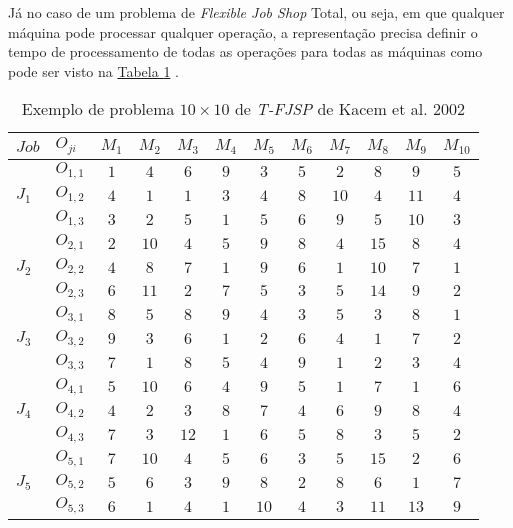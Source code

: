 \indent Já no caso de um problema de \textit{Flexible Job Shop} Total, ou seja, em que qualquer máquina pode processar qualquer operação, a representação precisa definir o tempo de processamento de todas as operações para todas as máquinas como pode ser visto na 
\hyperref[tab:ex-instancia-problema-TFJSP]{Tabela \ref{tab:ex-instancia-problema-TFJSP}}
.
\begin{table}[htb]
    \centering
    \caption{Exemplo de problema $10\times10$ de \textit{T-FJSP} de Kacem et al. 2002}
    \label{tab:ex-instancia-problema-TFJSP}
    \begin{tabular}[t]{llcccccccccc}
\hline
$Job$&$O_{ji}$&$M_1$&$M_2$&$M_3$&$M_4$&$M_5$&$M_6$&$M_7$&$M_8$&$M_9$&$M_{10}$\\
\hline
\multirow{3}{*}{$J_1$}&$O_{1,1}$ & $1$ & $4$ & $6$ & $9$ & $3$ & $5$ & $2$ & $8$ & $9$ & $5$\\
&$O_{1,2}$ & $4$ & $1$ & $1$ & $3$ & $4$ & $8$ & $10$ & $4$ & $11$ & $4$\\
&$O_{1,3}$ & $3$ & $2$ & $5$ & $1$ & $5$ & $6$ & $9$ & $5$ & $10$ & $3$\\
\multirow{3}{*}{$J_2$}&$O_{2,1}$ & $2$ & $10$ & $4$ & $5$ & $9$ & $8$ & $4$ & $15$ & $8$ & $4$\\
&$O_{2,2}$ & $4$ & $8$ & $7$ & $1$ & $9$ & $6$ & $1$ & $10$ & $7$ & $1$\\
&$O_{2,3}$ & $6$ & $11$ & $2$ & $7$ & $5$ & $3$ & $5$ & $14$ & $9$ & $2$\\
\multirow{3}{*}{$J_3$}&$O_{3,1}$ & $8$ & $5$ & $8$ & $9$ & $4$ & $3$ & $5$ & $3$ & $8$ & $1$\\
&$O_{3,2}$ & $9$ & $3$ & $6$ & $1$ & $2$ & $6$ & $4$ & $1$ & $7$ & $2$\\
&$O_{3,3}$ & $7$ & $1$ & $8$ & $5$ & $4$ & $9$ & $1$ & $2$ & $3$ & $4$\\
\multirow{3}{*}{$J_4$}&$O_{4,1}$ & $5$ & $10$ & $6$ & $4$ & $9$ & $5$ & $1$ & $7$ & $1$ & $6$\\
&$O_{4,2}$ & $4$ & $2$ & $3$ & $8$ & $7$ & $4$ & $6$ & $9$ & $8$ & $4$\\
&$O_{4,3}$ & $7$ & $3$ & $12$ & $1$ & $6$ & $5$ & $8$ & $3$ & $5$ & $2$\\
\multirow{3}{*}{$J_5$}&$O_{5,1}$ & $7$ & $10$ & $4$ & $5$ & $6$ & $3$ & $5$ & $15$ & $2$ & $6$\\
&$O_{5,2}$ & $5$ & $6$ & $3$ & $9$ & $8$ & $2$ & $8$ & $6$ & $1$ & $7$\\
&$O_{5,3}$ & $6$ & $1$ & $4$ & $1$ & $10$ & $4$ & $3$ & $11$ & $13$ & $9$\\

\end{tabular}
\end{table}
